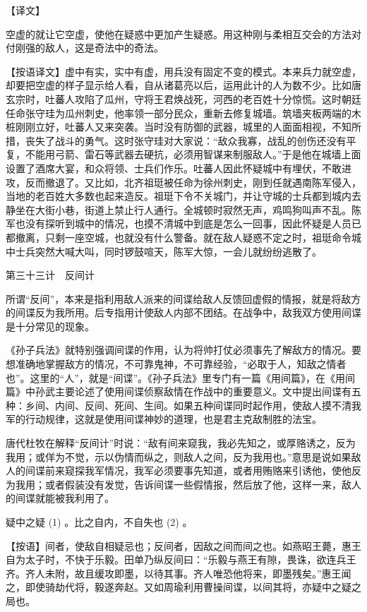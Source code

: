 \documentclass[12pt,UTF8]{ctexbook}
\begin{document}
【译文】


空虚的就让它空虚，使他在疑惑中更加产生疑惑。用这种刚与柔相互交会的方法对付刚强的敌人，这是奇法中的奇法。

【按语译文】虚中有实，实中有虚，用兵没有固定不变的模式。本来兵力就空虚，却要把空虚的样子显示给人看，自从诸葛亮以后，运用此计的人为数不少。比如唐玄宗时，吐蕃人攻陷了瓜州，守将王君焕战死，河西的老百姓十分惊慌。这时朝廷任命张守珪为瓜州刺史，他率领一部分民众，重新去修复城墙。筑墙夹板两端的木桩刚刚立好，吐蕃人又来突袭。当时没有防御的武器，城里的人面面相视，不知所措，丧失了战斗的勇气。这时张守珪对大家说：“敌众我寡，战乱的创伤还没有平复，不能用弓箭、雷石等武器去硬抗，必须用智谋来制服敌人。”于是他在城墙上面设置了酒席大宴，和众将领、士兵们作乐。吐蕃人因此怀疑城中有埋伏，不敢进攻，反而撤退了。又比如，北齐祖珽被任命为徐州刺史，刚到任就遇南陈军侵入，当地的老百姓大多数也起来造反。祖珽下令不关城门，并让守城的士兵都到城内去静坐在大街小巷，街道上禁止行人通行。全城顿时寂然无声，鸡鸣狗叫声不乱。陈军也没有探听到城中的情况，也摸不清城中到底是怎么一回事，因此怀疑是人员已都撤离，只剩一座空城，也就没有什么警备。就在敌人疑惑不定之时，祖珽命令城中士兵突然大喊大叫，同时锣鼓喧天，陈军大惊，一会儿就纷纷逃散了。





第三十三计　反间计


所谓“反间”，本来是指利用敌人派来的间谍给敌人反馈回虚假的情报，就是将敌方的间谍反为我所用。后专指用计使敌人内部不团结。在战争中，敌我双方使用间谍是十分常见的现象。

《孙子兵法》就特别强调间谍的作用，认为将帅打仗必须事先了解敌方的情况。要想准确地掌握敌方的情况，不可靠鬼神，不可靠经验，“必取于人，知敌之情者也”。这里的“人”，就是“间谍”。《孙子兵法》里专门有一篇《用间篇》，在《用间篇》中孙武主要论述了使用间谍侦察敌情在作战中的重要意义。文中提出间谍有五种：乡间、内间、反间、死间、生间。如果五种间谍同时起作用，使敌人摸不清我军的行动规律，这就是使用间谍神妙的道理，也是君主克敌制胜的法宝。

唐代杜牧在解释“反间计”时说：“敌有间来窥我，我必先知之，或厚赂诱之，反为我用；或佯为不觉，示以伪情而纵之，则敌人之间，反为我用也。”意思是说如果敌人的间谍前来窥探我军情况，我军必须要事先知道，或者用贿赂来引诱他，使他反为我用；或者假装没有发觉，告诉间谍一些假情报，然后放了他，这样一来，敌人的间谍就能被我利用了。





疑中之疑 (1) 。比之自内，不自失也 (2) 。

【按语】间者，使敌自相疑忌也；反间者，因敌之间而间之也。如燕昭王薨，惠王自为太子时，不快于乐毅。田单乃纵反间曰：“乐毅与燕王有隙，畏诛，欲连兵王齐。齐人未附，故且缓攻即墨，以待其事。齐人唯恐他将来，即墨残矣。”惠王闻之，即使骑劫代将，毅遂奔赵。又如周瑜利用曹操间谍，以间其将，亦疑中之疑之局也。
\end{document}
